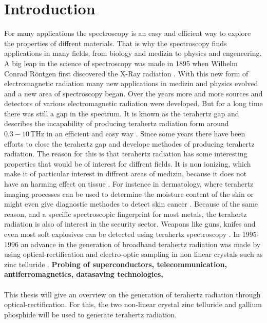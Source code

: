 \chapter{Introduction}
For many applications the spectroscopy is an easy and efficient way to explore the properties of diffrent materials.
That is why the spectroscopy finds applications in many fields, from biology and medizin to physics and engeneering.
A big leap in the science of spectroscopy was made in 1895 when Wilhelm Conrad Röntgen first discovered the X-Ray radiation \cite{roentgen}.
With this new form of electromagnetic radiation many new applications in medizin and physics evolved and a new area of spectroscopy began.
Over the years more and more sources and detectors of various electromagnetic radiation were developed.
But for a long time there was still a gap in the spectrum.
It is known as the terahertz gap and describes the incapability of producing terahertz radiation form around $0.3-10\,\si{\tera\hertz}$ in an efficient and easy way \cite{THzgap_applications}.
Since some years there have been efforts to close the terahertz gap and develope methodes of producing terahertz radiation.
The reason for this is that terahertz radiation has some interesting properties that would be of interest for diffrent fields.
It is non ionizing, which make it of particular interest in diffrent areas of medizin, because it does not have an harming effect on tissue \cite{THzgap_applications}.
For instence in dermatology, where terahertz imaging processes can be used to determine the moisture content of the skin or might even give diagnostic methodes to detect skin cancer \cite{terahertz_dermatology}. 
Because of the same reason, and a specific spectroscopic fingerprint for most metals, the terahertz radiation is also of interest in the security sector.
Weapons like guns, knifes and even most soft explosives can be detected using terahertz spectroscopy \cite{THzgap_applications} \cite{thz_explosive_detec}.
In 1995-1996 an advance in the generation of broadband terahertz radiation was made by using optical-rectification and electro-optic sampling in non linear crystals such as zinc telluride \cite{first_eos_wu_zhang}\cite{ZnTe_Nahata_Weling_1996}.
\textbf{Probing of superconductors, telecommunication, antiferromagnetics, datasaving technologies, }
\\\\
This thesis will give an overview on the generation of terahertz radiation through optical-rectification.
For this, the two non-linear crystal zinc telluride and gallium phosphide will be used to generate terahertz radiation.
